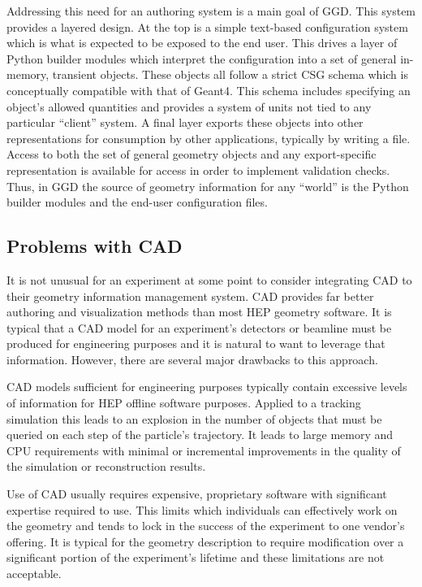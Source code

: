 Addressing this need for an authoring system is a main goal of GGD.
This system provides a layered design.  At the top is a simple
text-based configuration system which is what is expected to be
exposed to the end user.  This drives a layer of Python builder
modules which interpret the configuration into a set of general
in-memory, transient objects.  These objects all follow a strict CSG
schema which is conceptually compatible with that of Geant4.  This
schema includes specifying an object's allowed quantities and provides
a system of units not tied to any particular ``client'' system.  A
final layer exports these objects into other representations for
consumption by other applications, typically by writing a file.
Access to both the set of general geometry objects and any
export-specific representation is available for access in order to
implement validation checks.  Thus, in GGD the source of geometry
information for any ``world'' is the Python builder modules and the
end-user configuration files.

\subsection{Problems with CAD}

It is not unusual for an experiment at some point to consider
integrating CAD to their geometry information management system.  CAD
provides far better authoring and visualization methods than most HEP
geometry software.  It is typical that a CAD model for an experiment's
detectors or beamline must be produced for engineering purposes and it
is natural to want to leverage that information.  However, there are
several major drawbacks to this approach.

CAD models sufficient for engineering purposes typically contain
excessive levels of information for HEP offline software purposes.
Applied to a tracking simulation this leads to an explosion in the
number of objects that must be queried on each step of the particle's
trajectory.  It leads to large memory and CPU requirements with
minimal or incremental improvements in the quality of the simulation
or reconstruction results.

Use of CAD usually requires expensive, proprietary software with
significant expertise required to use.  This limits which individuals can
effectively work on the geometry and tends to lock in the success of
the experiment to one vendor's offering.  It is typical for the geometry
description to require modification over a significant portion of the
experiment's lifetime and these limitations are not acceptable.

